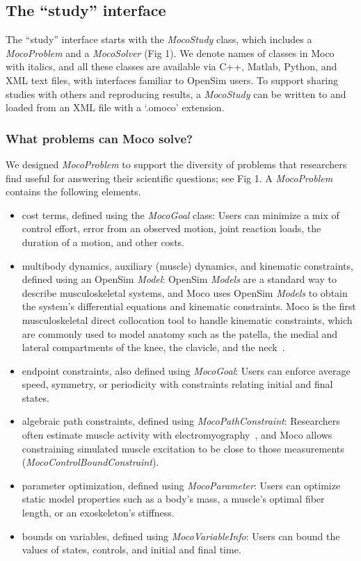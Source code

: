 \documentclass[10pt,letterpaper]{article}
\begin{document}
\subsection*{The “study” interface}
The “study” interface starts with the \textit{MocoStudy} class, which includes a \textit{MocoProblem} and a \textit{MocoSolver} (Fig 1). We denote names of classes in Moco with italics, and all these classes are available via C++, Matlab, Python, and XML text files, with interfaces familiar to OpenSim users. To support sharing studies with others and reproducing results, a \textit{MocoStudy} can be written to and loaded from an XML file with a ‘.omoco’ extension.

\subsubsection*{What problems can Moco solve?}

We designed \textit{MocoProblem} to support the diversity of problems that researchers find useful for answering their scientific questions; see Fig 1. A \textit{MocoProblem} contains the following elements.

\begin{itemize}
    \item cost terms, defined using the \textit{MocoGoal} class: Users can minimize a mix of control effort, error from an observed motion, joint reaction loads, the duration of a motion, and other costs.
    \item multibody dynamics, auxiliary (muscle) dynamics, and kinematic constraints, defined using an OpenSim \textit{Model}: OpenSim \textit{Models} are a standard way to describe musculoskeletal systems, and Moco uses OpenSim \textit{Models} to obtain the system’s differential equations and kinematic constraints. Moco is the first musculoskeletal direct collocation tool to handle kinematic constraints, which are commonly used to model anatomy such as the patella, the medial and lateral compartments of the knee, the clavicle, and the neck~\cite{Seth:2016,Lerner:2015,Rajagopal:2016ek,Cazzola:2017}.
    \item endpoint constraints, also defined using \textit{MocoGoal}: Users can enforce average speed, symmetry, or periodicity with constraints relating initial and final states.
    \item algebraic path constraints, defined using \textit{MocoPathConstraint}: Researchers often estimate muscle activity with electromyography~\cite{Pizzolato:2015,Falisse:2016}, and Moco allows constraining simulated muscle excitation to be close to those measurements (\textit{MocoControlBoundConstraint}).
    \item parameter optimization, defined using \textit{MocoParameter}: Users can optimize static model properties such as a body’s mass, a muscle’s optimal fiber length, or an exoskeleton’s stiffness.
    \item bounds on variables, defined using \textit{MocoVariableInfo}: Users can bound the values of states, controls, and initial and final time.
\end{itemize}
\end{document}
